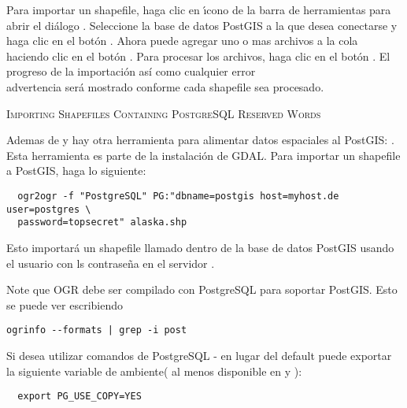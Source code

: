 Para importar un shapefile, haga clic en \'{\i}cono de la barra de herramientas  para abrir el di\'alogo . Seleccione la base de datos PostGIS a la que desea conectarse y haga clic en el bot\'on . Ahora puede agregar uno o mas archivos a la cola haciendo clic en el bot\'on   . Para procesar los archivos, haga clic en el bot\'on  
. El progreso de la importaci\'on as\'{i} como cualquier error\\advertencia ser\'a mostrado conforme cada shapefile sea procesado.

\begin{Tip}\caption{\textsc{Importing Shapefiles Containing
PostgreSQL Reserved Words}}
\end{Tip} 

Ademas de  y  hay otra herramienta para alimentar datos espaciales al PostGIS: . Esta herramienta es parte de la instalaci\'on de GDAL.
Para importar un shapefile a PostGIS, haga lo siguiente:
\begin{verbatim}
  ogr2ogr -f "PostgreSQL" PG:"dbname=postgis host=myhost.de user=postgres \
  password=topsecret" alaska.shp
\end{verbatim}

Esto importar\'a un shapefile  llamado  dentro de la base de datos PostGIS
\usertext{postgis}
usando el usuario  con ls contrase\~na  en el servidor
\server{myhost.de}.

Note que OGR debe ser compilado con PostgreSQL para soportar PostGIS.
Esto se puede ver escribiendo
\begin{verbatim}
ogrinfo --formats | grep -i post
\end{verbatim}

Si desea utilizar comandos de PostgreSQL - en lugar del default
\filename{INSERT INTO} puede exportar la siguiente variable de ambiente( al menos disponible en \nix y \osx):
\begin{verbatim}
  export PG_USE_COPY=YES
\end{verbatim}

